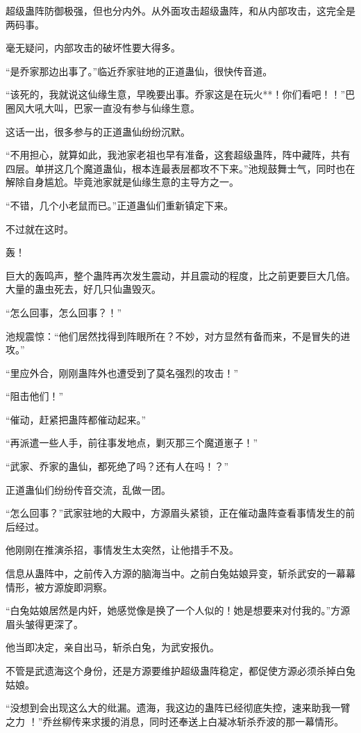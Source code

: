 \begin{this_body}
超级蛊阵防御极强，但也分内外。从外面攻击超级蛊阵，和从内部攻击，这完全是两码事。

毫无疑问，内部攻击的破坏性要大得多。

“是乔家那边出事了。”临近乔家驻地的正道蛊仙，很快传音道。

“该死的，我就说这仙缘生意，早晚要出事。乔家这是在玩火**！你们看吧！！”巴圈风大吼大叫，巴家一直没有参与仙缘生意。

这话一出，很多参与的正道蛊仙纷纷沉默。

“不用担心，就算如此，我池家老祖也早有准备，这套超级蛊阵，阵中藏阵，共有四层。单拼这几个魔道蛊仙，根本连最表层都攻不下来。”池规鼓舞士气，同时也在解除自身尴尬。毕竟池家就是仙缘生意的主导方之一。

“不错，几个小老鼠而已。”正道蛊仙们重新镇定下来。

不过就在这时。

轰！

巨大的轰鸣声，整个蛊阵再次发生震动，并且震动的程度，比之前更要巨大几倍。大量的蛊虫死去，好几只仙蛊毁灭。

“怎么回事，怎么回事？！”

池规震惊：“他们居然找得到阵眼所在？不妙，对方显然有备而来，不是冒失的进攻。”

“里应外合，刚刚蛊阵外也遭受到了莫名强烈的攻击！”

“阻击他们！”

“催动，赶紧把蛊阵都催动起来。”

“再派遣一些人手，前往事发地点，剿灭那三个魔道崽子！”

“武家、乔家的蛊仙，都死绝了吗？还有人在吗！？”

正道蛊仙们纷纷传音交流，乱做一团。

“怎么回事？”武家驻地的大殿中，方源眉头紧锁，正在催动蛊阵查看事情发生的前后经过。

他刚刚在推演杀招，事情发生太突然，让他措手不及。

信息从蛊阵中，之前传入方源的脑海当中。之前白兔姑娘异变，斩杀武安的一幕幕情形，被方源旋即洞察。

“白兔姑娘居然是内奸，她感觉像是换了一个人似的！她是想要来对付我的。”方源眉头皱得更深了。

他当即决定，亲自出马，斩杀白兔，为武安报仇。

不管是武遗海这个身份，还是方源要维护超级蛊阵稳定，都促使方源必须杀掉白兔姑娘。

“没想到会出现这么大的纰漏。遗海，我这边的蛊阵已经彻底失控，速来助我一臂之力 ！”乔丝柳传来求援的消息，同时还奉送上白凝冰斩杀乔波的那一幕情形。


\end{this_body}
